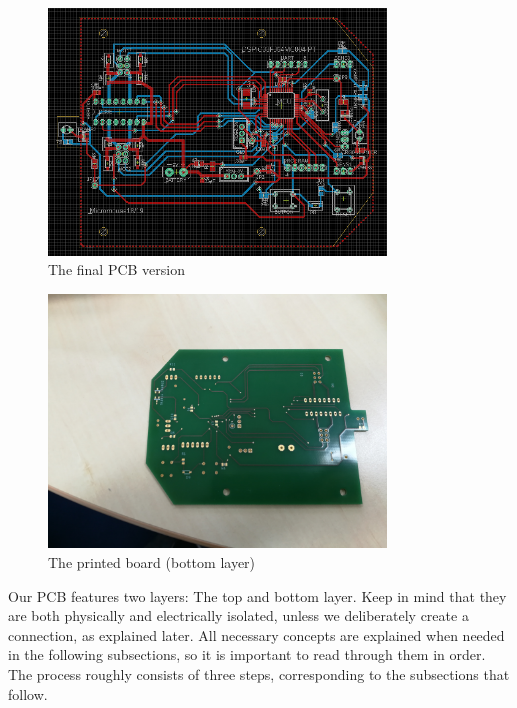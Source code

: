 \begin{figure}[H]
    \centering
    \includegraphics[width=0.8\textwidth]{figures/hardware/PCB.PNG}
    \caption{The final PCB version}
    \label{fig:pcb}
\end{figure}

\begin{figure}[H]
    \centering
    \includegraphics[width=0.8\textwidth]{figures/hardware/printed.jpg}
    \caption{The printed board (bottom layer)}
    \label{fig:print}
\end{figure}

\noindent
Our PCB features two layers: The top and bottom layer. Keep in mind that they are both physically and electrically isolated, unless we deliberately create a connection, as explained later. All necessary concepts are explained when needed in the following subsections, so it is important to read through them in order.\\
The process roughly consists of three steps, corresponding to the subsections that follow.

